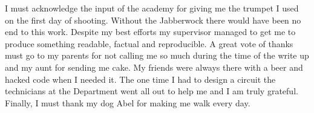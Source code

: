 
\begin{acknowledgements}      

I must acknowledge the input of the academy for giving me the trumpet I used on the first day of shooting. Without the Jabberwock there would have been no end to this work. Despite my best efforts my supervisor managed to get me to produce something readable, factual and reproducible. A great vote of thanks must go to my parents for not calling me so much during the time of the write up and my aunt for sending me cake. My friends were always there with a beer and hacked code when I needed it. The one time I had to design a circuit the technicians at the Department went all out to help me and I am truly grateful. Finally, I must thank my dog Abel for making me walk every day.


\end{acknowledgements}

